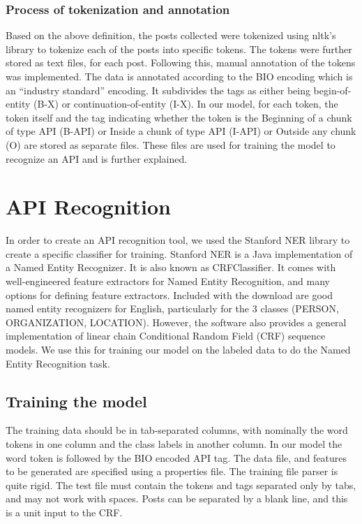 \documentclass{sig-alternate-05-2015}
\begin{document}
\subsubsection{Process of tokenization and annotation}

Based on the above definition, the posts collected were tokenized using nltk’s library to tokenize each of the posts into specific tokens. The tokens were further stored as text files, for each post. Following this, manual annotation of the tokens was implemented. The data is annotated according to the BIO encoding which is an “industry standard” encoding.
It subdivides the tags as either being begin-of-entity {(B-X)} or continuation-of-entity {(I-X)}. In our model, for each token, the token itself and the tag indicating whether the token is the Beginning of a chunk of type API (B-API) or Inside a chunk of type API (I-API) or Outside any chunk (O) are stored as separate files. These files are used for training the model to recognize an API and is further explained. 


\section{API Recognition}
In order to create an API recognition tool, we used the Stanford NER library to create a specific classifier for training. Stanford NER is a Java implementation of a Named Entity Recognizer. It  is also known as CRFClassifier. It comes with well-engineered feature extractors for Named Entity Recognition, and many options for defining feature extractors. Included with the download are good named entity recognizers for English, particularly for the 3 classes (PERSON, ORGANIZATION, LOCATION). However, the software also provides a general implementation of linear chain Conditional Random Field (CRF) sequence models. We use this for training our model on the labeled data to do the Named Entity Recognition task.

\subsection{Training the model}
The training data should be in tab-separated columns, with nominally the word tokens in one column and the class labels in another column. In our model the word token is followed by the BIO encoded API tag. The data file, and features to be generated are specified using a properties file.  The training file parser is quite rigid. The test file must contain the tokens and tags separated only by tabs, and may not work with spaces. Posts can be separated by a blank line, and this is a unit input to the CRF. 
\end{document}
